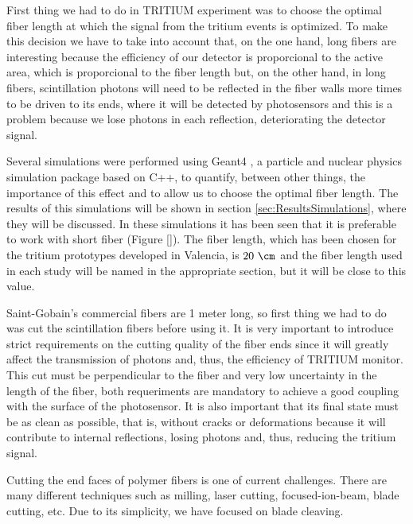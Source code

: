 First thing we had to do in TRITIUM experiment was to choose the optimal fiber length at which the signal from the tritium events is optimized. To make this decision we have to take into account that, on the one hand, long fibers are interesting because the efficiency of our detector is proporcional to the active area, which is proporcional to the fiber length but, on the other hand, in long fibers, scintillation photons will need to be reflected in the fiber walls more times to be driven to its ends, where it will be detected by photosensors and this is a problem because we lose photons in each reflection, deteriorating the detector signal.

Several simulations were performed using Geant4 \cite{Geant4WebPage}, a particle and nuclear physics simulation package based on C++, to quantify, between other things, the importance of this effect and to allow us to choose the optimal fiber length. The results of this simulations will be shown in section \ref{sec:ResultsSimulations}, where they will be discussed. In these simulations it has been seen that it is preferable to work with short fiber (Figure \ref{}). The fiber length, which has been chosen for the tritium prototypes developed in Valencia, is $20~\cm$ and the fiber length used in each study will be named in the appropriate section, but it will be close to this value.

Saint-Gobain's commercial fibers are 1 meter long, so first thing we had to do was cut the scintillation fibers before using it. It is very important to introduce strict requirements on the cutting quality of the fiber ends since it will greatly affect the transmission of photons and, thus, the efficiency of TRITIUM monitor. This cut must be perpendicular to the fiber and very low uncertainty in the length of the fiber, both requeriments are mandatory to achieve a good coupling with the surface of the photosensor. It is also important that its final state must be as clean as possible, that is, without cracks or deformations because it will contribute to internal reflections, losing photons and, thus, reducing the tritium signal.

Cutting the end faces of polymer fibers is one of current challenges. There are many different techniques such as milling, laser cutting, focused-ion-beam, blade cutting, etc. Due to its simplicity, we have focused on blade cleaving. %

